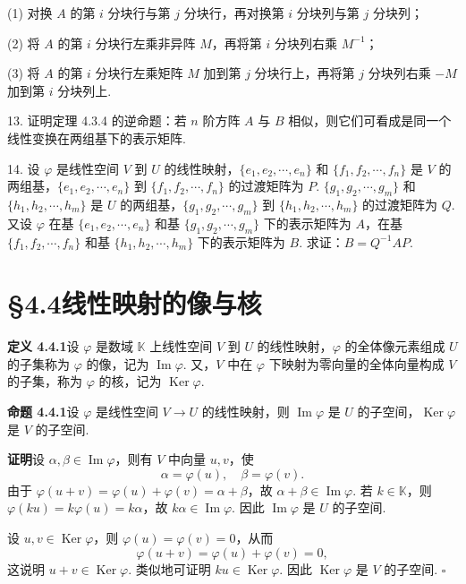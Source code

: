 \documentclass[UTF8,12pt,a4paper,fontset=fandol]{ctexart}
\begin{document}
(1) 对换 $A$ 的第 $i$ 分块行与第 $j$ 分块行，再对换第 $i$ 分块列与第 $j$ 分块列；

(2) 将 $A$ 的第 $i$ 分块行左乘非异阵 $M$，再将第 $i$ 分块列右乘 $M^{-1}$；

(3) 将 $A$ 的第 $i$ 分块行左乘矩阵 $M$ 加到第 $j$ 分块行上，再将第 $j$ 分块列右乘 $-M$ 加到第 $i$ 分块列上.

13. 证明定理 4.3.4 的逆命题：若 $n$ 阶方阵 $A$ 与 $B$ 相似，则它们可看成是同一个线性变换在两组基下的表示矩阵.

14. 设 $\varphi$ 是线性空间 $V$ 到 $U$ 的线性映射，$\{e_1,e_2,\cdots,e_n\}$ 和 $\{f_1,f_2,\cdots,f_n\}$ 是 $V$ 的两组基，$\{e_1,e_2,\cdots,e_n\}$ 到 $\{f_1,f_2,\cdots,f_n\}$ 的过渡矩阵为 $P$. $\{g_1,g_2,\cdots,g_m\}$ 和 $\{h_1,h_2,\cdots,h_m\}$ 是 $U$ 的两组基，$\{g_1,g_2,\cdots,g_m\}$ 到 $\{h_1,h_2,\cdots,h_m\}$ 的过渡矩阵为 $Q$. 又设 $\varphi$ 在基 $\{e_1,e_2,\cdots,e_n\}$ 和基 $\{g_1,g_2,\cdots,g_m\}$ 下的表示矩阵为 $A$，在基 $\{f_1,f_2,\cdots,f_n\}$ 和基 $\{h_1,h_2,\cdots,h_m\}$ 下的表示矩阵为 $B$. 求证：$B=Q^{-1}AP$.

\section*{§4.4\quad 线性映射的像与核}

\noindent\textbf{定义 4.4.1}\quad 设 $\varphi$ 是数域 $\mathbb{K}$ 上线性空间 $V$ 到 $U$ 的线性映射，$\varphi$ 的全体像元素组成 $U$ 的子集称为 $\varphi$ 的像，记为 $\operatorname{Im}\varphi$. 又，$V$ 中在 $\varphi$ 下映射为零向量的全体向量构成 $V$ 的子集，称为 $\varphi$ 的核，记为 $\operatorname{Ker}\varphi$.

\noindent\textbf{命题 4.4.1}\quad 设 $\varphi$ 是线性空间 $V\to U$ 的线性映射，则 $\operatorname{Im}\varphi$ 是 $U$ 的子空间，$\operatorname{Ker}\varphi$ 是 $V$ 的子空间.

\noindent\textbf{证明}\quad 设 $\alpha,\beta\in\operatorname{Im}\varphi$，则有 $V$ 中向量 $u,v$，使
\[
\alpha=\varphi(u),\quad \beta=\varphi(v).
\]
由于 $\varphi(u+v)=\varphi(u)+\varphi(v)=\alpha+\beta$，故 $\alpha+\beta\in\operatorname{Im}\varphi$. 若 $k\in\mathbb{K}$，则 $\varphi(ku)=k\varphi(u)=k\alpha$，故 $k\alpha\in\operatorname{Im}\varphi$. 因此 $\operatorname{Im}\varphi$ 是 $U$ 的子空间.

设 $u,v\in\operatorname{Ker}\varphi$，则 $\varphi(u)=\varphi(v)=0$，从而
\[
\varphi(u+v)=\varphi(u)+\varphi(v)=0,
\]
这说明 $u+v\in\operatorname{Ker}\varphi$. 类似地可证明 $ku\in\operatorname{Ker}\varphi$. 因此 $\operatorname{Ker}\varphi$ 是 $V$ 的子空间. $\square$
\end{document}
